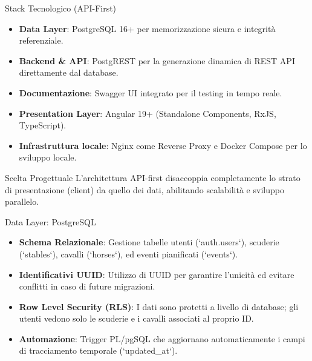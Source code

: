 \documentclass[aspectratio=169]{beamer}
\begin{document}
\begin{frame}{Stack Tecnologico (API-First)}
    \begin{itemize}
        \item \textbf{Data Layer}: PostgreSQL 16+ per memorizzazione sicura e integrità referenziale.
        \item \textbf{Backend & API}: PostgREST per la generazione dinamica di REST API direttamente dal database.
        \item \textbf{Documentazione}: Swagger UI integrato per il testing in tempo reale.
        \item \textbf{Presentation Layer}: Angular 19+ (Standalone Components, RxJS, TypeScript).
        \item \textbf{Infrastruttura locale}: Nginx come Reverse Proxy e Docker Compose per lo sviluppo locale.
    \end{itemize}
    \begin{block}{Scelta Progettuale}
        L'architettura API-first disaccoppia completamente lo strato di presentazione (client) da quello dei dati, abilitando scalabilità e sviluppo parallelo.
    \end{block}
\end{frame}

\begin{frame}{Data Layer: PostgreSQL}
    \begin{itemize}
        \item \textbf{Schema Relazionale}: Gestione tabelle utenti (`auth.users`), scuderie (`stables`), cavalli (`horses`), ed eventi pianificati (`events`).
        \item \textbf{Identificativi UUID}: Utilizzo di UUID per garantire l'unicità ed evitare conflitti in caso di future migrazioni.
        \item \textbf{Row Level Security (RLS)}: I dati sono protetti a livello di database; gli utenti vedono solo le scuderie e i cavalli associati al proprio ID.
        \item \textbf{Automazione}: Trigger PL/pgSQL che aggiornano automaticamente i campi di tracciamento temporale (`updated\_at`).
    \end{itemize}
\end{frame}
\end{document}
